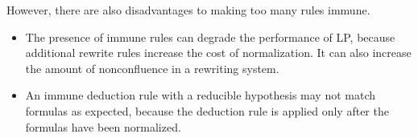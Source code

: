 \p
However, there are also disadvantages to making too many rules immune.
\begin{itemize}
\item
The presence of immune rules can degrade the performance of LP, because
additional rewrite rules increase the cost of normalization.  It can also
increase the amount of nonconfluence in a rewriting system.
\p
\item
An immune deduction rule with a reducible hypothesis may not match formulas as
expected, because the deduction rule is applied only after the formulas have
been normalized.
\end{itemize}
